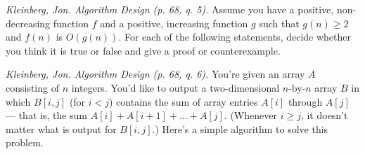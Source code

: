 \documentclass[answers]{exam}  %
\begin{document}
\begin{questions}
\begin{parts}
\begin{solutionbox}{1in}
  \end{solutionbox}
  
\end{parts}

\pagebreak

  \question \textit{Kleinberg, Jon. Algorithm Design (p. 68, q. 5).} Assume you have a positive, non-decreasing function $f$ and a positive, increasing function $g$ such that $g(n) \geq 2$ and $f(n)$ is $O(g(n))$. For each of the following statements, decide whether you think it is true or false and give a proof or counterexample.


\pagebreak

\question \textit{Kleinberg, Jon. Algorithm Design (p. 68, q. 6).} You're given an array $A$ consisting of $n$ integers. You'd like to output a two-dimensional $n$-by-$n$ array $B$ in which $B[i, j]$ (for $i < j$) contains the sum of array entries $A[i]$ through $A[j]$ — that is, the sum $A[i]+ A[i + 1]+... + A[j]$. (Whenever $i \geq j$, it doesn't matter what is output for $B[i,j]$.)  
Here's a simple algorithm to solve this problem. 


\end{questions}
\end{document}
